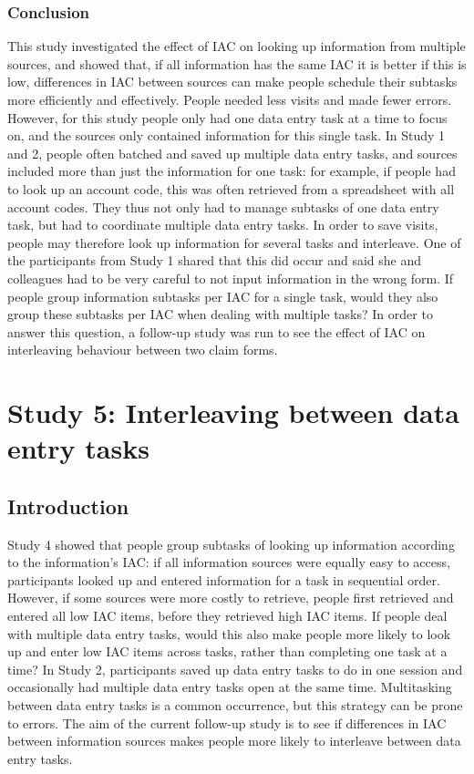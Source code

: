 \begin{table}
\begin{itemize}
\subsubsection{Conclusion}
This study investigated the effect of IAC on looking up information from multiple sources, and showed that, if all information has the same IAC it is better if this is low, differences in IAC between sources can make people schedule their subtasks more efficiently and effectively. People needed less visits and made fewer errors. 
However, for this study people only had one data entry task at a time to focus on, and the sources only contained information for this single task. In Study 1 and 2, people often batched and saved up multiple data entry tasks, and sources included more than just the information for one task: for example, if people had to look up an account code, this was often retrieved from a spreadsheet with all account codes. They thus not only had to manage subtasks of one data entry task, but had to coordinate multiple data entry tasks. In order to save visits, people may therefore look up information for several tasks and interleave. One of the participants from Study 1 shared that this did occur and said she and colleagues had to be very careful to not input information in the wrong form. If people group information subtasks per IAC for a single task, would they also group these subtasks per IAC when dealing with multiple tasks? In order to answer this question, a follow-up study was run to see the effect of IAC on interleaving behaviour between two claim forms. 


\section{Study 5: Interleaving between data entry tasks}
 
\subsection{Introduction}
Study 4 showed that people group subtasks of looking up information according to the information's IAC: if all information sources were equally easy to access, participants looked up and entered information for a task in sequential order. However, if some sources were more costly to retrieve, people first retrieved and entered all low IAC items, before they retrieved high IAC items.
If people deal with multiple data entry tasks, would this also make people more likely to look up and enter low IAC items across tasks, rather than completing one task at a time? 
In Study 2, participants saved up data entry tasks to do in one session and occasionally had multiple data entry tasks open at the same time. Multitasking between data entry tasks is a common occurrence, but this strategy can be prone to errors.
The aim of the current follow-up study is to see if differences in IAC between information sources makes people more likely to interleave between data entry tasks.


\end{itemize}
\end{table}
